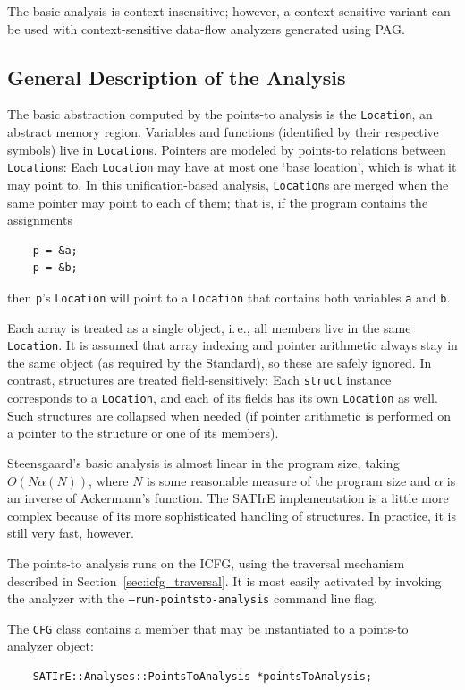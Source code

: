 \documentclass[a4paper,12pt]{report}
\begin{document}
The basic analysis is context-insensitive; however, a context-sensitive
variant can be used with context-sensitive data-flow analyzers generated
using PAG.

\subsection{General Description of the Analysis}

The basic abstraction computed by the points-to analysis is the
\texttt{Location}, an abstract memory region. Variables and functions
(identified by their respective symbols) live in \texttt{Location}s.
Pointers are modeled by points-to relations between \texttt{Location}s: Each
\texttt{Location} may have at most one `base location', which is what it may
point to. In this unification-based analysis, \texttt{Location}s are merged
when the same pointer may point to each of them; that is, if the program
contains the assignments
\begin{verbatim}
    p = &a;
    p = &b;
\end{verbatim}
then \verb|p|'s \texttt{Location} will point to a \texttt{Location} that
contains both variables \verb|a| and \verb|b|.

Each array is treated as a single object, i.\,e., all members live in the
same \texttt{Location}. It is assumed that array indexing and pointer
arithmetic always stay in the same object (as required by the Standard), so
these are safely ignored. In contrast, structures are treated
field-sensitively: Each \texttt{struct} instance corresponds to a
\texttt{Location}, and each of its fields has its own \texttt{Location} as
well. Such structures are collapsed when needed (if pointer arithmetic is
performed on a pointer to the structure or one of its members).

Steensgaard's basic analysis is almost linear in the program size, taking
\(O(N \alpha(N))\), where \(N\) is some reasonable measure of the program
size and \(\alpha\) is an inverse of Ackermann's function. The SATIrE
implementation is a little more complex because of its more sophisticated
handling of structures. In practice, it is still very fast, however.

The points-to analysis runs on the ICFG, using the traversal mechanism
described in Section~\ref{sec:icfg_traversal}. It is most easily activated
by invoking the analyzer with the \texttt{--run-pointsto-analysis} command
line flag.

The \texttt{CFG} class contains a member that may be instantiated to a
points-to analyzer object:
\begin{verbatim}
    SATIrE::Analyses::PointsToAnalysis *pointsToAnalysis;
\end{verbatim}
\end{document}
